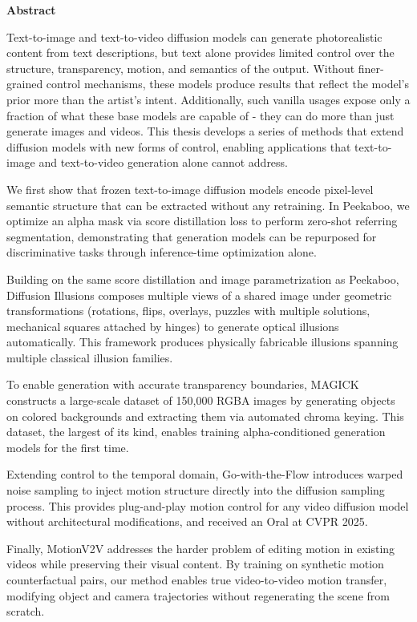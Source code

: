 \begin{center}
\noindent \textbf{\Large Abstract}
\vspace{0.8em}
\end{center}

Text-to-image and text-to-video diffusion models can generate photorealistic content from text descriptions, but text alone provides limited control over the structure, transparency, motion, and semantics of the output. Without finer-grained control mechanisms, these models produce results that reflect the model's prior more than the artist's intent. Additionally, such vanilla usages expose only a fraction of what these base models are capable of - they can do more than just generate images and videos. This thesis develops a series of methods that extend diffusion models with new forms of control, enabling applications that text-to-image and text-to-video generation alone cannot address.

\vspace{0.5em}

We first show that frozen text-to-image diffusion models encode pixel-level semantic structure that can be extracted without any retraining. In Peekaboo, we optimize an alpha mask via score distillation loss to perform zero-shot referring segmentation, demonstrating that generation models can be repurposed for discriminative tasks through inference-time optimization alone.

\vspace{0.5em}

Building on the same score distillation and image parametrization as Peekaboo, Diffusion Illusions composes multiple views of a shared image under geometric transformations (rotations, flips, overlays, puzzles with multiple solutions, mechanical squares attached by hinges) to generate optical illusions automatically. This framework produces physically fabricable illusions spanning multiple classical illusion families.

\vspace{0.5em}

To enable generation with accurate transparency boundaries, MAGICK constructs a large-scale dataset of 150,000 RGBA images by generating objects on colored backgrounds and extracting them via automated chroma keying. This dataset, the largest of its kind, enables training alpha-conditioned generation models for the first time.

\vspace{0.5em}

Extending control to the temporal domain, Go-with-the-Flow introduces warped noise sampling to inject motion structure directly into the diffusion sampling process. This provides plug-and-play motion control for any video diffusion model without architectural modifications, and received an Oral  at CVPR 2025.

\vspace{0.5em}

Finally, MotionV2V addresses the harder problem of editing motion in existing videos while preserving their visual content. By training on synthetic motion counterfactual pairs, our method enables true video-to-video motion transfer, modifying object and camera trajectories without regenerating the scene from scratch.
